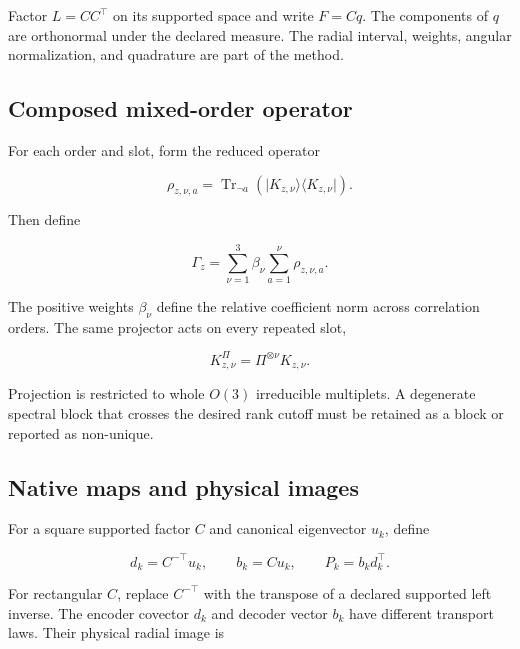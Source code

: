 \documentclass[10pt,twocolumn]{article}
\begin{document}
Factor $L=CC^\top$ on its supported space and write $F=Cq$. The components of $q$ are orthonormal under the declared measure. The radial interval, weights, angular normalization, and quadrature are part of the method.

\subsection{Composed mixed-order operator}

For each order and slot, form the reduced operator

\begin{equation}
\rho_{z,\nu,a}=
\operatorname{Tr}_{\neg a}
\left(\lvert K_{z,\nu}\rangle
\langle K_{z,\nu}\rvert\right).
\label{eq:marginal}
\end{equation}

Then define

\begin{equation}
\Gamma_z=\sum_{\nu=1}^{3}\beta_\nu
\sum_{a=1}^{\nu}\rho_{z,\nu,a}.
\label{eq:gamma}
\end{equation}

The positive weights $\beta_\nu$ define the relative coefficient norm across correlation orders. The same projector acts on every repeated slot,

\begin{equation}
K_{z,\nu}^{\Pi}
=\Pi^{\otimes\nu}K_{z,\nu}.
\label{eq:projection}
\end{equation}

Projection is restricted to whole $O(3)$ irreducible multiplets. A degenerate spectral block that crosses the desired rank cutoff must be retained as a block or reported as non-unique.

\subsection{Native maps and physical images}

For a square supported factor $C$ and canonical eigenvector $u_k$, define

\begin{equation}
d_k=C^{-\top}u_k,
\qquad
b_k=Cu_k,
\qquad
P_k=b_kd_k^\top.
\label{eq:maps}
\end{equation}

For rectangular $C$, replace $C^{-\top}$ with the transpose of a declared supported left inverse. The encoder covector $d_k$ and decoder vector $b_k$ have different transport laws. Their physical radial image is
\end{document}
